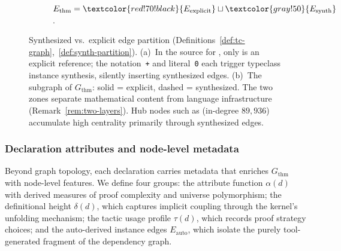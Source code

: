 \begin{figure}[!htb]
\begin{subfigure}[t]{0.46\textwidth}
\caption{$E_{\mathrm{thm}} = \textcolor{red!70!black}{E_{\mathrm{explicit}}} \sqcup \textcolor{gray!50}{E_{\mathrm{synth}}}$.}
\label{fig:tc-graph}
\end{subfigure}
\caption{Synthesized vs.\ explicit edge partition (Definitions~\ref{def:tc-graph},~\ref{def:synth-partition}). (a)~In the source for , only  is an explicit reference; the notation~\texttt{+} and literal~\texttt{0} each trigger typeclass instance synthesis, silently inserting \textcolor{gray!50}{synthesized edges}. (b)~The subgraph of $G_{\mathrm{thm}}$: \textcolor{red!70!black}{solid} = explicit, \textcolor{gray!50}{dashed} = synthesized. The two zones separate mathematical content from language infrastructure (Remark~\ref{rem:two-layers}). Hub nodes such as  (in-degree $89{,}936$) accumulate high centrality primarily through synthesized edges.}
\label{fig:synth-partition}
\end{figure}

\subsubsection{Declaration attributes and node-level metadata}
\label{sec:decl-attributes}
Beyond graph topology, each declaration carries metadata that enriches $G_{\mathrm{thm}}$ with node-level features. We define four groups: the attribute function $\alpha(d)$ with derived measures of proof complexity and universe polymorphism; the definitional height $\delta(d)$, which captures implicit coupling through the kernel's unfolding mechanism; the tactic usage profile $\tau(d)$, which records proof strategy choices; and the auto-derived instance edges $E_{\mathrm{auto}}$, which isolate the purely tool-generated fragment of the dependency graph.

